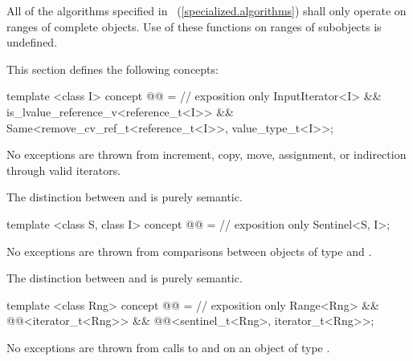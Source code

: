{\color{addclr}
\setcounter{Paras}{0}
\pnum
All of the algorithms specified in ~(\ref{specialized.algorithms}) shall only operate on ranges of
complete objects. Use of these functions on ranges of subobjects is undefined.


\pnum This section defines the following concepts:

\begin{itemdecl}
template <class I>
concept @@ = // exposition only
  InputIterator<I> &&
  is_lvalue_reference_v<reference_t<I>> &&
  Same<remove_cv_ref_t<reference_t<I>>, value_type_t<I>>;
\end{itemdecl}

\begin{itemdescr}
\pnum No exceptions are thrown from increment, copy, move, assignment, or indirection through valid
iterators.

\pnum
\enternote The distinction between  and
 is purely semantic.\exitnote
\end{itemdescr}

\begin{itemdecl}
template <class S, class I>
concept @@ = // exposition only
  Sentinel<S, I>;
\end{itemdecl}

\begin{itemdescr}
\pnum No exceptions are thrown from comparisons between objects of type  and .

\pnum
\enternote The distinction between  and
 is purely semantic.\exitnote
\end{itemdescr}

\begin{itemdecl}
template <class Rng>
concept @@ = // exposition only
  Range<Rng> &&
  @@<iterator_t<Rng>> &&
  @@<sentinel_t<Rng>, iterator_t<Rng>>;
\end{itemdecl}

\begin{itemdescr}
\pnum No exceptions are thrown from calls to  and  on an object of type
.


\end{itemdescr}}
